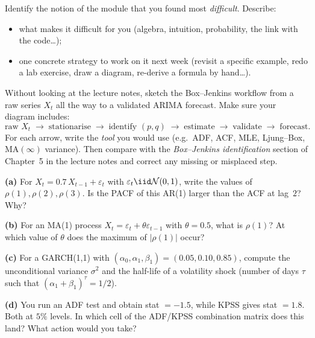 \documentclass[a4paper,11pt]{article}
\begin{document}
\begin{question}
Identify the notion of the module that you found most
\emph{difficult}. Describe:
\begin{itemize}
  \item what makes it difficult for you (algebra, intuition,
        probability, the link with the code\dots);
  \item one concrete strategy to work on it next week (revisit a
        specific example, redo a lab exercise, draw a diagram,
        re-derive a formula by hand\dots).
\end{itemize}
\end{question}

\begin{question}
Without looking at the lecture notes, sketch the Box--Jenkins
workflow from a raw series $X_t$ all the way to a validated ARIMA
forecast. Make sure your diagram includes:
\[
  \text{raw } X_t
  \;\to\; \text{stationarise}
  \;\to\; \text{identify }(p, q)
  \;\to\; \text{estimate}
  \;\to\; \text{validate}
  \;\to\; \text{forecast.}
\]
For each arrow, write the \emph{tool} you would use (e.g.\ ADF,
ACF, MLE, Ljung--Box, MA$(\infty)$ variance). Then compare with the
\emph{Box--Jenkins identification} section of Chapter~5 in the
lecture notes and correct any missing or misplaced step.
\end{question}

\begin{question}
\textbf{(a)} For $X_t = 0.7\, X_{t-1} + \varepsilon_t$ with
$\varepsilon_t \iid \mathcal N(0, 1)$, write the values of
$\rho(1), \rho(2), \rho(3)$. Is the PACF of this AR(1) larger than
the ACF at lag~$2$? Why?

\medskip
\textbf{(b)} For an MA(1) process $X_t = \varepsilon_t + \theta
\varepsilon_{t-1}$ with $\theta = 0.5$, what is $\rho(1)$? At
which value of $\theta$ does the maximum of $|\rho(1)|$ occur?

\medskip
\textbf{(c)} For a GARCH(1,1) with $(\alpha_0, \alpha_1, \beta_1) =
(0.05, 0.10, 0.85)$, compute the unconditional variance
$\sigma^2$ and the half-life of a volatility shock (number of days
$\tau$ such that $(\alpha_1 + \beta_1)^{\tau} = 1/2$).

\medskip
\textbf{(d)} You run an ADF test and obtain stat $= -1.5$, while
KPSS gives stat $= 1.8$. Both at $5\%$ levels. In which cell of
the ADF/KPSS combination matrix does this land? What action would
you take?
\end{question}
\end{document}
